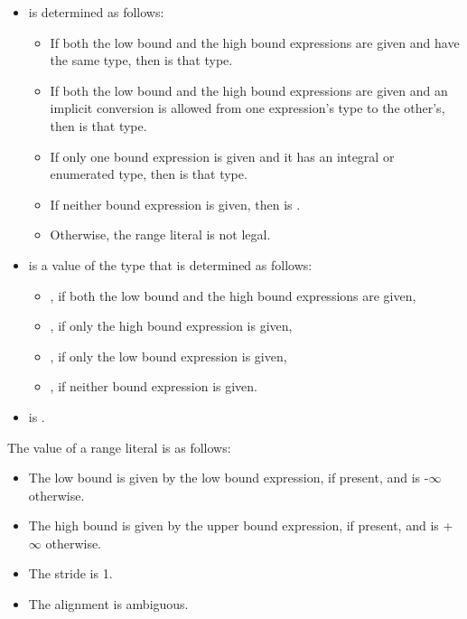 \begin{itemize}

\item {} is determined as follows:
  \begin{itemize}

  \item If both the low bound and the high bound expressions are given
        and have the same type, then  is that type.

  \item If both the low bound and the high bound expressions are given
        and an implicit conversion is allowed from one expression's type
        to the other's, then  is that type.

  \item If only one bound expression is given and it has an integral or
        enumerated type, then  is that type.

  \item If neither bound expression is given, then  is
        .

  \item Otherwise, the range literal is not legal.
  \end{itemize}

\item {} is a value of the type 
that is determined as follows:
  \begin{itemize}

  \item {}, if both the low bound and the high bound expressions
         are given,

  \item {}, if only the high bound expression is given,

  \item {}, if only the low bound expression is given,

  \item {}, if neither bound expression is given.
  \end{itemize}

\item {} is .

\end{itemize}

The value of a range literal is as follows:

\begin{itemize}

\item The low bound is given by the low bound expression,
if present, and is -$\infty$ otherwise.

\item The high bound is given by the upper bound expression,
if present, and is +$\infty$ otherwise.

\item The stride is 1.

\item The alignment is ambiguous.

\end{itemize}



